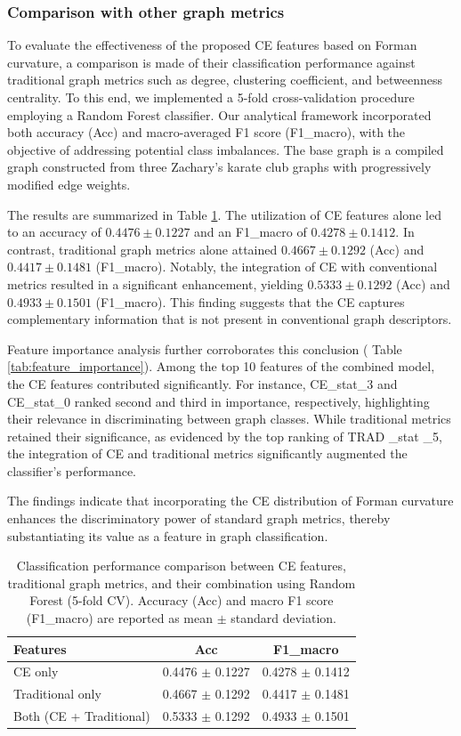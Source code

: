 \documentclass[preprint,12pt,number]{elsarticle}
\theoremstyle{plain} %
\theoremstyle{definition} %
\begin{document}
\subsubsection{Comparison with other graph metrics}
To evaluate the effectiveness of the proposed CE features based on Forman curvature, a comparison is made of their classification performance against traditional graph metrics such as degree, clustering coefficient, and betweenness centrality. To this end, we implemented a 5-fold cross-validation procedure employing a Random Forest classifier. Our analytical framework incorporated both accuracy (Acc) and macro-averaged F1 score (F1\_macro), with the objective of addressing potential class imbalances. The base graph is a compiled graph constructed from three Zachary's karate club graphs with progressively modified edge weights.

The results are summarized in Table \ref{tab:ce_vs_trad}. The utilization of CE features alone led to an accuracy of $0.4476 \pm 0.1227$ and an F1\_macro of $0.4278 \pm 0.1412$. In contrast, traditional graph metrics alone attained $0.4667 \pm 0.1292$ (Acc) and $0.4417 \pm 0.1481$ (F1\_macro). Notably, the integration of CE with conventional metrics resulted in a significant enhancement, yielding $0.5333 \pm 0.1292$ (Acc) and $0.4933 \pm 0.1501$ (F1\_macro). This finding suggests that the CE captures complementary information that is not present in conventional graph descriptors.

Feature importance analysis further corroborates this conclusion ( Table \ref{tab:feature_importance}). Among the top 10 features of the combined model, the CE features contributed significantly. For instance, CE\_stat\_3 and CE\_stat\_0 ranked second and third in importance, respectively, highlighting their relevance in discriminating between graph classes. While traditional metrics retained their significance, as evidenced by the top ranking of TRAD \_stat \_5, the integration of CE and traditional metrics significantly augmented the classifier's performance.

The findings indicate that incorporating the CE distribution of Forman curvature enhances the discriminatory power of standard graph metrics, thereby substantiating its value as a feature in graph classification.

\begin{table}[H]
\centering
\caption{Classification performance comparison between CE features, traditional graph metrics, and their combination using Random Forest (5-fold CV). Accuracy (Acc) and macro F1 score (F1\_macro) are reported as mean $\pm$ standard deviation.}
\label{tab:ce_vs_trad}
\begin{tabular}{lcc}
\hline
Features & Acc & F1\_macro \\
\hline
CE only       & 0.4476 $\pm$ 0.1227 & 0.4278 $\pm$ 0.1412 \\
Traditional only & 0.4667 $\pm$ 0.1292 & 0.4417 $\pm$ 0.1481 \\
Both (CE + Traditional) & 0.5333 $\pm$ 0.1292 & 0.4933 $\pm$ 0.1501 \\
\hline
\end{tabular}
\end{table}
\end{document}
